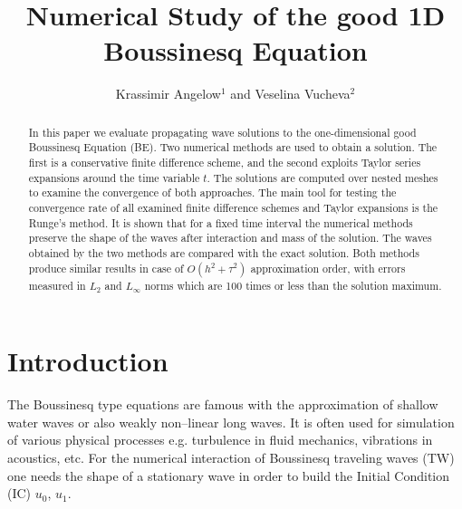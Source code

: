 \documentclass[%
 aip,
cp,  
 amsmath,amssymb,
 reprint,
]{iopconfser}
\begin{document}
\title{Numerical Study of the good 1D Boussinesq Equation}

\author{Krassimir Angelow$^{1}$ and Veselina Vucheva$^{2}$}




\begin{abstract}
In this paper we evaluate propagating wave solutions to the one-dimensional good Boussinesq Equation (BE).
Two numerical methods are used to obtain a solution. The first is a conservative finite difference scheme, and the second exploits Taylor series expansions around the time variable $t$. 
The solutions are computed over nested meshes to examine the convergence of both approaches. The main tool for testing the convergence rate of all examined finite difference schemes and Taylor expansions is the Runge's method. It is shown that for a fixed time interval the numerical methods preserve the shape of the waves after interaction and mass of the solution. The waves obtained by the two methods are compared with the exact solution.
Both methods produce similar results in case of $O(h^{2} + \tau^2 )$ approximation order, with errors measured in $L_2$ and $L_\infty$ norms which are 100 times or less than the solution maximum.
\end{abstract}

\section{\label{sec:level1}Introduction}

The Boussinesq type equations are famous with the approximation of shallow water waves or also weakly non--linear long waves. It is often used for simulation of various physical processes e.g. turbulence in fluid mechanics, vibrations in acoustics, etc. For the numerical interaction of Boussinesq traveling waves (TW) one needs the shape of a stationary wave in order to build the Initial Condition (IC) $u_0$, $u_1$.
\end{document}
